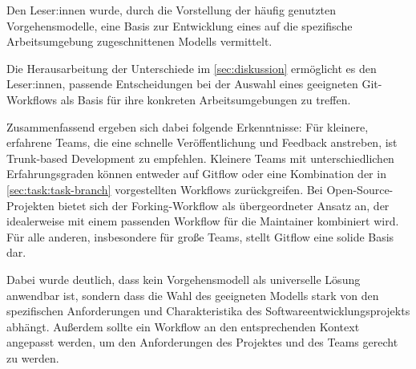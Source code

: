 Den Leser:innen wurde, durch die Vorstellung der häufig genutzten Vorgehensmodelle, eine Basis zur Entwicklung eines auf die spezifische Arbeitsumgebung zugeschnittenen Modells vermittelt. 

Die Herausarbeitung der Unterschiede im \autoref{sec:diskussion} ermöglicht es den Leser:innen, passende Entscheidungen bei der Auswahl eines geeigneten Git\hyp Workflows als Basis für ihre konkreten Arbeitsumgebungen zu treffen.

Zusammenfassend ergeben sich dabei folgende Erkenntnisse: Für kleinere, erfahrene Teams, die eine schnelle Veröffentlichung und Feedback anstreben, ist Trunk\hyp based Development zu empfehlen. Kleinere Teams mit unterschiedlichen Erfahrungsgraden können entweder auf Gitflow oder eine Kombination der in \autoref{sec:task:task-branch} vorgestellten Workflows zurückgreifen. Bei Open\hyp Source\hyp Projekten bietet sich der Forking\hyp Workflow als übergeordneter Ansatz an, der idealerweise mit einem passenden Workflow für die Maintainer kombiniert wird. Für alle anderen, insbesondere für große Teams, stellt Gitflow eine solide Basis dar.

Dabei wurde deutlich, dass kein Vorgehensmodell als universelle Lösung anwendbar ist, sondern dass die Wahl des geeigneten Modells stark von den spezifischen Anforderungen und Charakteristika des Softwareentwicklungsprojekts abhängt. Außerdem sollte ein Workflow an den entsprechenden Kontext angepasst werden, um den Anforderungen des Projektes und des Teams gerecht zu werden.
